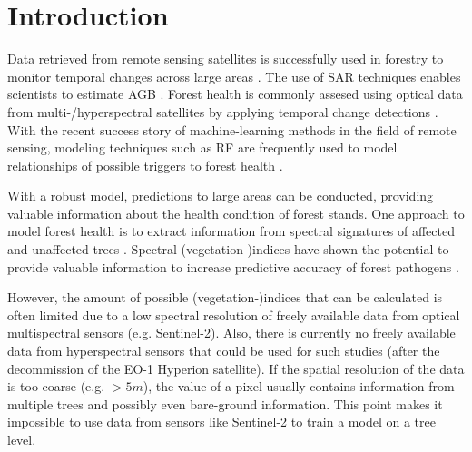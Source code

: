 \documentclass[review]{elsarticle}
\begin{document}
\section{Introduction}
\label{sec:intro}

Data retrieved from remote sensing satellites is successfully used in forestry to monitor temporal changes across large areas \citep{martinezdelcastilloEvaluationForestCover2015,sextonModelPropagationUncertainty2015}.
The use of \ac{SAR} techniques enables scientists to estimate \ac{AGB} \citep{luSurveyRemoteSensingbased2016, sinhaReviewRadarRemote2015}.
Forest health is commonly assesed using optical data from multi-/hyperspectral satellites by applying temporal change detections \citep{zhangRemoteSensingSeasonal2016}.
With the recent success story of machine-learning methods in the field of remote sensing, modeling techniques such as \ac{RF} are frequently used to model relationships of possible triggers to forest health \citep{belgiuRandomForestRemote2016, laryMachineLearningGeosciences2016, michezClassificationRiparianForest2016}.

With a robust model, predictions to large areas can be conducted, providing valuable information about the health condition of forest stands.
One approach to model forest health is to extract information from spectral signatures of affected and unaffected trees \citep{lelongEvaluationOilPalmFungal2010}.
Spectral (vegetation-)indices have shown the potential to provide valuable information to increase predictive accuracy of forest pathogens \citep{jiangSatellitederivedVegetationIndices2014, adamczykRededgeVegetationIndices2015}.

However, the amount of possible (vegetation-)indices that can be calculated is often limited due to a low spectral resolution of freely available data from optical multispectral sensors (e.g. Sentinel-2).
Also, there is currently no freely available data from hyperspectral sensors that could be used for such studies (after the decommission of the EO-1 Hyperion satellite).
If the spatial resolution of the data is too coarse (e.g. $> 5 m$), the value of a pixel usually contains information from multiple trees and possibly even bare-ground information.
This point makes it impossible to use data from sensors like Sentinel-2 to train a model on a tree level.

\end{document}
